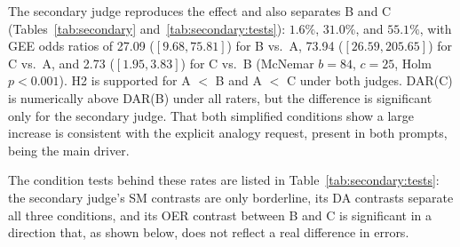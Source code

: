 \documentclass[journal,article,submit,pdftex,moreauthors]{Definitions/mdpi}
\begin{document}
The secondary judge reproduces the effect and also separates B and C (Tables~\ref{tab:secondary} and~\ref{tab:secondary:tests}): $1.6\%$, $31.0\%$, and $55.1\%$, with GEE odds ratios of 27.09 ($[9.68, 75.81]$) for B vs.\ A, 73.94 ($[26.59, 205.65]$) for C vs.\ A, and 2.73 ($[1.95, 3.83]$) for C vs.\ B (McNemar $b = 84$, $c = 25$, Holm $p < 0.001$). H2 is supported for A $<$ B and A $<$ C under both judges. DAR(C) is numerically above DAR(B) under all raters, but the difference is significant only for the secondary judge. That both simplified conditions show a large increase is consistent with the explicit analogy request, present in both prompts, being the main driver.

\begin{table}[H]
\caption{Secondary judge (Qwen3:32b, 245 responses per condition): rates (\%) with Wilson 95\% CI and counts in parentheses. OER is undefined in A by construction; the flagged baseline responses are shown in parentheses for completeness.}
\label{tab:secondary}
\centering
\footnotesize
{}
\end{table}

The condition tests behind these rates are listed in Table~\ref{tab:secondary:tests}: the secondary judge's SM contrasts are only borderline, its DA contrasts separate all three conditions, and its OER contrast between B and C is significant in a direction that, as shown below, does not reflect a real difference in errors.
\end{document}

